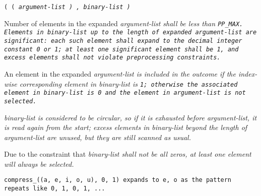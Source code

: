 
 \tt{( (} \it{argument-list} \tt{) ,} \it{binary-list} \tt{)}


Number of elements in the expanded
\it{argument-list} shall be less than \tt{PP_MAX}.
Elements in \it{binary-list} up to the length of expanded \it{argument-list}
are significant: each such element shall expand to the decimal integer
constant \tt{0} or \tt{1}; at least one significant element shall be \tt{1},
and excess elements shall not violate preprocessing constraints.


An element in the expanded \it{argument-list} is included in the outcome
if the index-wise corresponding element in \it{binary-list} is \tt{1};
otherwise the associated element in \it{binary-list} is \tt{0}
and the element in \it{argument-list} is not selected.

\it{binary-list} is considered to be circular, so if it is
exhausted before \it{argument-list}, it is read again from the start;
excess elements in \it{binary-list} beyond the length of
\it{argument-list} are unused, but they are still scanned as usual.

\note Due to the constraint that \it{binary-list} shall not be all zeros,
at least one element will always be selected.

\example \tt{compress_((a, e, i, o, u), 0, 1)} expands to
\tt{e, o} as the pattern repeats like \tt{0, 1, 0, 1, ...}
